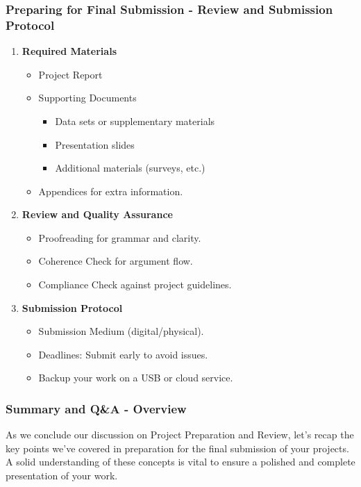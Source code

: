 \documentclass[aspectratio=169]{beamer}
\begin{document}
\begin{frame}[fragile]
    \frametitle{Preparing for Final Submission - Review and Submission Protocol}
    \begin{enumerate}
        \item \textbf{Required Materials}
            \begin{itemize}
                \item Project Report
                \item Supporting Documents
                \begin{itemize}
                    \item Data sets or supplementary materials
                    \item Presentation slides
                    \item Additional materials (surveys, etc.)
                \end{itemize}
                \item Appendices for extra information.
            \end{itemize}
        \item \textbf{Review and Quality Assurance}
            \begin{itemize}
                \item Proofreading for grammar and clarity.
                \item Coherence Check for argument flow.
                \item Compliance Check against project guidelines.
            \end{itemize}
        \item \textbf{Submission Protocol}
            \begin{itemize}
                \item Submission Medium (digital/physical).
                \item Deadlines: Submit early to avoid issues.
                \item Backup your work on a USB or cloud service.
            \end{itemize}
    \end{enumerate}
\end{frame}

\begin{frame}[fragile]
    \frametitle{Summary and Q\&A - Overview}
    As we conclude our discussion on Project Preparation and Review, let's recap the key points we've covered in preparation for the final submission of your projects. 
    A solid understanding of these concepts is vital to ensure a polished and complete presentation of your work.
\end{frame}
\end{document}
